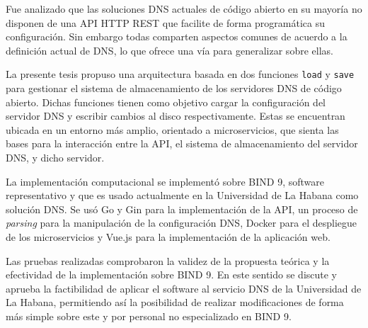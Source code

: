 \begin{conclusions}
Fue analizado que las soluciones DNS actuales de código abierto en su mayoría no disponen de una API HTTP REST que facilite de forma programática su configuración. Sin embargo todas comparten aspectos comunes de acuerdo a la definición actual de DNS, lo que ofrece una vía para generalizar sobre ellas.

La presente tesis propuso una arquitectura basada en dos funciones \verb|load| y \verb|save| para gestionar el sistema de almacenamiento de los servidores DNS de código abierto. Dichas funciones tienen como objetivo cargar la configuración del servidor DNS y escribir cambios al disco respectivamente. Estas se encuentran ubicada en un entorno más amplio, orientado a microservicios, que sienta las bases para la interacción entre la API, el sistema de almacenamiento del servidor DNS, y dicho servidor.

La implementación computacional se implementó sobre BIND 9, software representativo y que es usado actualmente en la Universidad de La Habana como solución DNS. Se usó Go y Gin para la implementación de la API, un proceso de \textit{parsing} para la manipulación de la configuración DNS, Docker para el despliegue de los microservicios y Vue.js para la implementación de la aplicación web.

Las pruebas realizadas comprobaron la validez de la propuesta teórica y la efectividad de la implementación sobre BIND 9. En este sentido se discute y aprueba la factibilidad de aplicar el software al servicio DNS de la Universidad de La Habana, permitiendo así la posibilidad de realizar modificaciones de forma más simple sobre este y por personal no especializado en BIND 9.
\end{conclusions}
